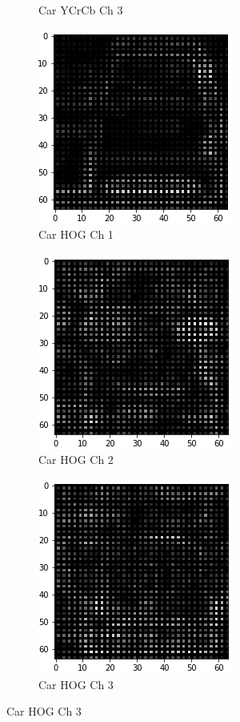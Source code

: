 \documentclass[12pt]{article}
\begin{document}
\begin{figure}[!h]
\begin{subfigure}{0.32\textwidth}
\caption{Car YCrCb Ch 3}
\end{subfigure}
\begin{subfigure}{0.32\textwidth}
\centering
\includegraphics[scale=0.5]{car_hog_ch1.png}
\caption{Car HOG Ch 1}
\end{subfigure}
\begin{subfigure}{0.32\textwidth}
\centering
\includegraphics[scale=0.5]{car_hog_ch2.png}
\caption{Car HOG Ch 2}
\end{subfigure}
\begin{subfigure}{0.32\textwidth}
\centering
\includegraphics[scale=0.5]{car_hog_ch3.png}
\caption{Car HOG Ch 3}
\end{subfigure}
\end{figure}
\end{document}
